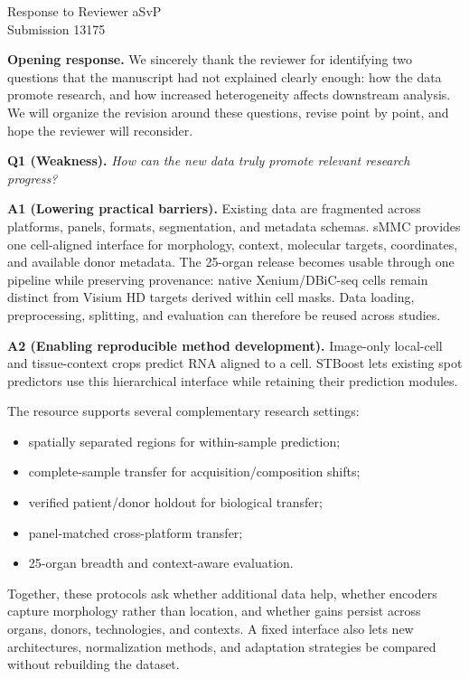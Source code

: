 \documentclass[10pt]{article}
\newcommand{\questionsep}{\par\vspace{1em}}
\begin{document}
\begin{center}
{\Large Response to Reviewer aSvP}\\[2pt]
Submission 13175
\end{center}

\textbf{Opening response.}
We sincerely thank the reviewer for identifying two questions that the
manuscript had not explained clearly enough: how the data promote research, and
how increased heterogeneity affects downstream analysis. We will organize the
revision around these questions, revise point by point, and hope the reviewer
will reconsider.

\questionsep
\textbf{Q1 (Weakness).}\quad
\textit{How can the new data truly promote relevant research progress?}

\textbf{A1 (Lowering practical barriers).}\enspace
Existing data are fragmented across platforms, panels, formats, segmentation,
and metadata schemas. sMMC provides one cell-aligned interface for morphology,
context, molecular targets, coordinates, and available donor metadata. The
25-organ release becomes usable through one pipeline while preserving
provenance: native Xenium/DBiC-seq cells remain distinct from Visium HD targets
derived within cell masks. Data loading, preprocessing, splitting, and
evaluation can therefore be reused across studies.

\textbf{A2 (Enabling reproducible method development).}\enspace
Image-only local-cell and tissue-context crops predict RNA aligned to a cell.
STBoost lets existing spot predictors use this hierarchical interface while
retaining their prediction modules.

The resource supports several complementary research settings:
\begin{itemize}
\item spatially separated regions for within-sample prediction;
\item complete-sample transfer for acquisition/composition shifts;
\item verified patient/donor holdout for biological transfer;
\item panel-matched cross-platform transfer;
\item 25-organ breadth and context-aware evaluation.
\end{itemize}

Together, these protocols ask whether additional data help, whether encoders
capture morphology rather than location, and whether gains persist across
organs, donors, technologies, and contexts. A fixed interface also lets new
architectures, normalization methods, and adaptation strategies be compared
without rebuilding the dataset.
\end{document}
